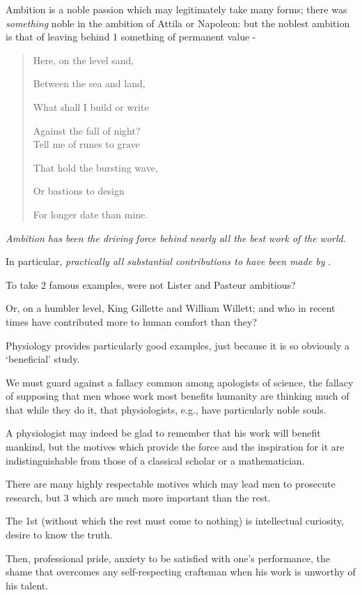 \documentclass{article}
\numberwithin{equation}{section}
\begin{document}
Ambition is a noble passion which may legitimately take many forms; there was \textit{something} noble in the ambition of Attila or Napoleon: but the noblest ambition is that of leaving behind 1 something of permanent value -
\begin{quotation}
    Here, on the level sand,
    
    Between the sea and land,
    
    What shall I build or write
    
    Against the fall of night?
    \\
    
    Tell me of runes to grave
    
    That hold the bursting wave,
    
    Or bastions to design
    
    For longer date than mine.
\end{quotation}
\textit{Ambition has been the driving force behind nearly all the best work of the world}.

In particular, \textit{practically all substantial contributions to  have been made by }.

To take 2 famous examples, were not Lister and Pasteur ambitious?

Or, on a humbler level, King Gillette and William Willett; and who in recent times have contributed more to human comfort than they?

%
Physiology provides particularly good examples, just because it is so obviously a `beneficial' study.

We must guard against a fallacy common among apologists of science, the fallacy of supposing that men whose work most benefits humanity are thinking much of that while they do it, that physiologists, e.g., have particularly noble souls.

A physiologist may indeed be glad to remember that his work will benefit mankind, but the motives which provide the force and the inspiration for it are indistinguishable from those of a classical scholar or a mathematician.

%
There are many highly respectable motives which may lead men to prosecute research, but 3 which are much more important than the rest.

The 1st (without which the rest must come to nothing) is intellectual curiosity, desire to know the truth.

Then, professional pride, anxiety to be satisfied with one's performance, the shame that overcomes any self-respecting craftsman when his work is unworthy of his talent.
\end{document}
